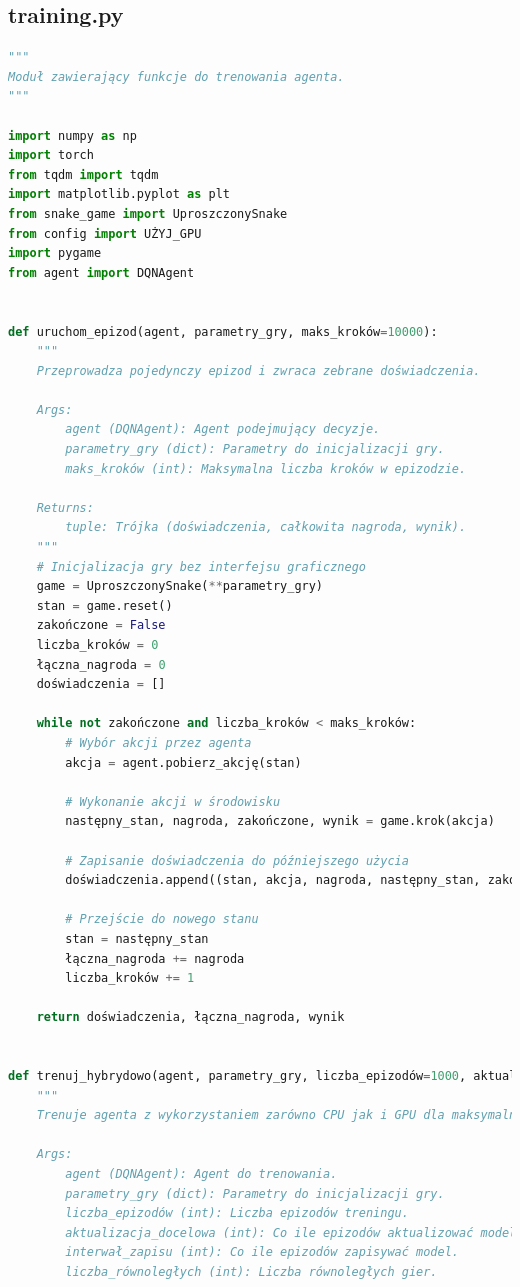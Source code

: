 \documentclass[a4paper,12pt]{article}
\begin{document}
\subsection{training.py}
\begin{lstlisting}[language=Python]
  """
Moduł zawierający funkcje do trenowania agenta.
"""

import numpy as np
import torch
from tqdm import tqdm
import matplotlib.pyplot as plt
from snake_game import UproszczonySnake
from config import UŻYJ_GPU
import pygame
from agent import DQNAgent
      

def uruchom_epizod(agent, parametry_gry, maks_kroków=10000):
    """
    Przeprowadza pojedynczy epizod i zwraca zebrane doświadczenia.
    
    Args:
        agent (DQNAgent): Agent podejmujący decyzje.
        parametry_gry (dict): Parametry do inicjalizacji gry.
        maks_kroków (int): Maksymalna liczba kroków w epizodzie.
        
    Returns:
        tuple: Trójka (doświadczenia, całkowita nagroda, wynik).
    """
    # Inicjalizacja gry bez interfejsu graficznego
    game = UproszczonySnake(**parametry_gry)
    stan = game.reset()
    zakończone = False
    liczba_kroków = 0
    łączna_nagroda = 0
    doświadczenia = []
    
    while not zakończone and liczba_kroków < maks_kroków:
        # Wybór akcji przez agenta
        akcja = agent.pobierz_akcję(stan)
        
        # Wykonanie akcji w środowisku
        następny_stan, nagroda, zakończone, wynik = game.krok(akcja)
        
        # Zapisanie doświadczenia do późniejszego użycia
        doświadczenia.append((stan, akcja, nagroda, następny_stan, zakończone))
        
        # Przejście do nowego stanu
        stan = następny_stan
        łączna_nagroda += nagroda
        liczba_kroków += 1
    
    return doświadczenia, łączna_nagroda, wynik


def trenuj_hybrydowo(agent, parametry_gry, liczba_epizodów=1000, aktualizacja_docelowa=10, interwał_zapisu=100, liczba_równoległych=4):
    """
    Trenuje agenta z wykorzystaniem zarówno CPU jak i GPU dla maksymalnej wydajności.
    
    Args:
        agent (DQNAgent): Agent do trenowania.
        parametry_gry (dict): Parametry do inicjalizacji gry.
        liczba_epizodów (int): Liczba epizodów treningu.
        aktualizacja_docelowa (int): Co ile epizodów aktualizować model docelowy.
        interwał_zapisu (int): Co ile epizodów zapisywać model.
        liczba_równoległych (int): Liczba równoległych gier.
        

\end{lstlisting}
\end{document}
